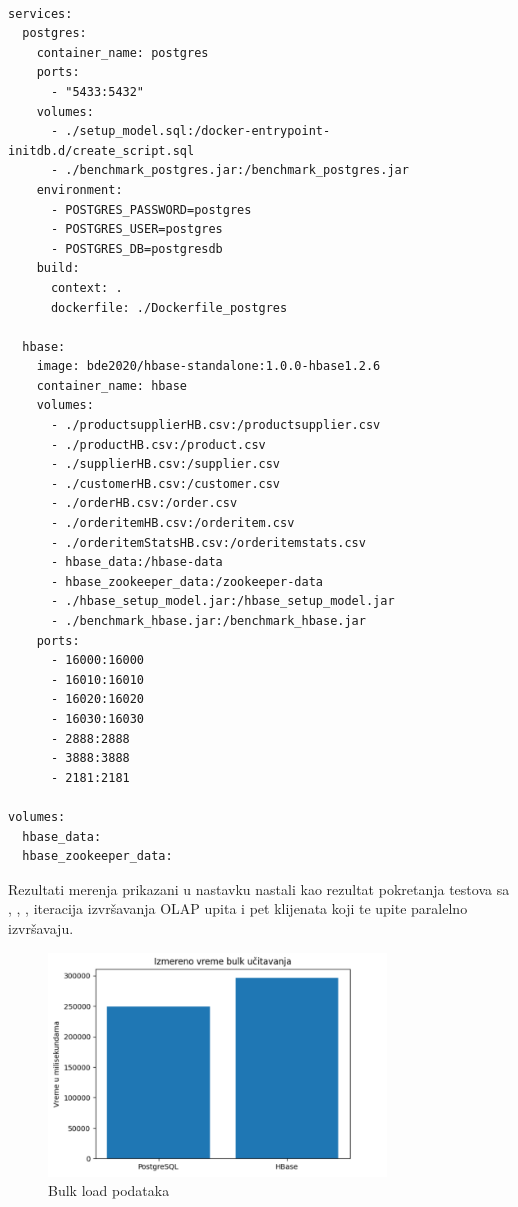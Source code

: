 \documentclass[12pt,oneside]{memoir}
\begin{document}
\begin{lstlisting}[title={docker-compose.yml},captionpos=t]

services: 
  postgres:
    container_name: postgres
    ports:
      - "5433:5432"
    volumes:
      - ./setup_model.sql:/docker-entrypoint-initdb.d/create_script.sql
      - ./benchmark_postgres.jar:/benchmark_postgres.jar
    environment:
      - POSTGRES_PASSWORD=postgres
      - POSTGRES_USER=postgres
      - POSTGRES_DB=postgresdb
    build:
      context: .
      dockerfile: ./Dockerfile_postgres

  hbase:
    image: bde2020/hbase-standalone:1.0.0-hbase1.2.6
    container_name: hbase
    volumes:
      - ./productsupplierHB.csv:/productsupplier.csv
      - ./productHB.csv:/product.csv
      - ./supplierHB.csv:/supplier.csv
      - ./customerHB.csv:/customer.csv
      - ./orderHB.csv:/order.csv
      - ./orderitemHB.csv:/orderitem.csv
      - ./orderitemStatsHB.csv:/orderitemstats.csv
      - hbase_data:/hbase-data
      - hbase_zookeeper_data:/zookeeper-data
      - ./hbase_setup_model.jar:/hbase_setup_model.jar
      - ./benchmark_hbase.jar:/benchmark_hbase.jar
    ports:
      - 16000:16000
      - 16010:16010
      - 16020:16020
      - 16030:16030
      - 2888:2888
      - 3888:3888
      - 2181:2181

volumes:
  hbase_data:
  hbase_zookeeper_data:
\end{lstlisting}

\pagebreak

Rezultati merenja prikazani u nastavku nastali kao rezultat pokretanja testova sa , , ,  iteracija izvršavanja OLAP upita i pet klijenata koji te upite paralelno izvršavaju.

\begin{figure}[!ht]
  \centering
  \includegraphics[width=0.8\textwidth]{bulk-load-vizualization.png}
  \caption{Bulk load podataka}
  \label{fig:grafikon}
\end{figure}
\end{document}

